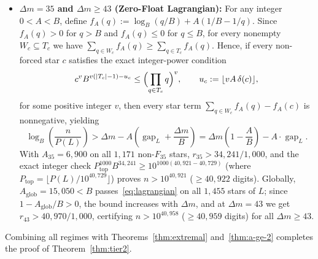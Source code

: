 \documentclass[11pt]{article}
\theoremstyle{remark}
\newcommand{\gap}{\operatorname{gap}}
\begin{document}
\begin{itemize}
  \item \textbf{$\Delta m = 35$ and $\Delta m \ge 43$ (Zero-Float Lagrangian):}
  For any integer $0 < A < B$, define
  $f_A(q) := \log_B(q/B) + A(1/B - 1/q)$. Since $f_A(q) > 0$ for $q > B$ and
  $f_A(q) \le 0$ for $q \le B$, for every nonempty $W_c \subseteq T_c$ we have
  $\sum_{q\in W_c} f_A(q) \ge \sum_{q\in T_c} f_A(q)$. Hence, if every
  non-forced star $c$ satisfies the exact integer-power condition
  \begin{equation}\label{eq:lagrangian}
    c^v B^{v(|T_c|-1) - u_c} \le \Bigl(\prod_{q\in T_c} q\Bigr)^v,
    \qquad u_c := \lfloor v A\,\delta(c)\rfloor,
  \end{equation}
  for some positive integer $v$, then every star term $\sum_{q\in W_c} f_A(q) - f_A(c)$
  is nonnegative, yielding
  \[
    \log_B\!\left(\frac{n}{P(L)}\right) > \Delta m - A\left(\gap_L + \frac{\Delta m}{B}\right)
    = \Delta m\left(1 - \frac{A}{B}\right) - A\cdot\gap_L.
  \]
  With $A_{35} = 6{,}900$ on all $1{,}171$ non-$F_{35}$ stars,
  $r_{35} > 34{,}241/1{,}000$, and the exact integer check
  $P_{\mathrm{top}}^{1000} B^{34{,}241} \ge 10^{1000(40{,}921 - 40{,}729)}$
  (where $P_{\mathrm{top}} = \lfloor P(L)/10^{40{,}729}\rfloor$) proves
  $n > 10^{40{,}921}$ ($\ge 40{,}922$ digits). Globally, $A_{\mathrm{glob}} = 15{,}050 < B$
  passes~\eqref{eq:lagrangian} on all $1{,}455$ stars of $L$; since $1 - A_{\mathrm{glob}}/B > 0$,
  the bound increases with $\Delta m$, and at $\Delta m = 43$ we get
  $r_{43} > 40{,}970/1{,}000$, certifying $n > 10^{40{,}958}$ ($\ge 40{,}959$
  digits) for all $\Delta m \ge 43$.
\end{itemize}
Combining all regimes with Theorems~\ref{thm:extremal} and~\ref{thm:a-ge-2}
completes the proof of Theorem~\ref{thm:tier2}.
\end{document}
